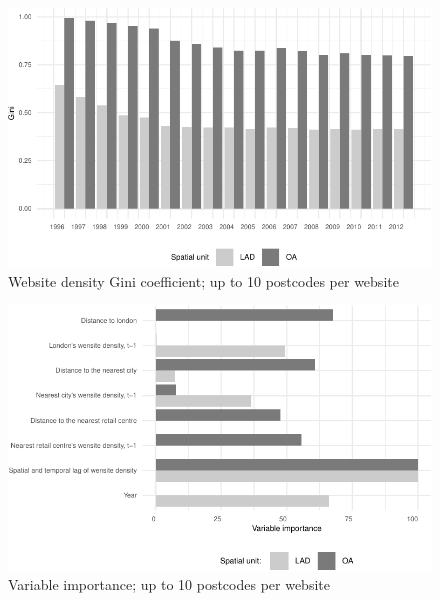 \documentclass[
  authoryear,
  preprint,
  3p]{elsarticle}
\begin{document}
\begin{figure}[H]

{\centering \includegraphics[width=1\textwidth,height=\textheight]{tranos2023_files/figure-pdf/gini10-1.pdf}

}

\caption{\label{gini10}Website density Gini coefficient; up to 10
postcodes per website}

\end{figure}%

\begin{figure}[H]

{\centering \includegraphics[width=1\textwidth,height=0.6\textheight]{tranos2023_files/figure-pdf/varimp10-1.pdf}

}

\caption{\label{var.imp10}Variable importance; up to 10 postcodes per
website}

\end{figure}%
\end{document}

